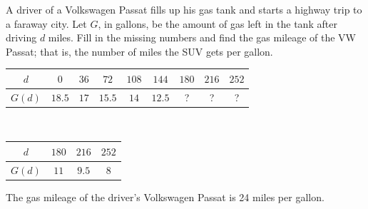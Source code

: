 


\begin{exercise}
A driver of a Volkswagen Passat fills up his gas tank and starts a highway trip to a faraway city. Let $G$, in gallons, be the amount of gas left in the tank after driving $d$ miles. Fill in the missing numbers and find the gas mileage of the VW Passat; that is, the number of miles the SUV gets per gallon.

\begin{center}
\begin{tabular}{|c|c|c|c|c|c|c|c|c|}
\hline
$d$ & $0$ & $36$ & $72$ & $108$ & $144$ & $180$ & $216$ & $252$ \\\hline
$G(d)$ & $18.5$  & $17$  & $15.5$ &  $14$ &  $12.5$ &  ? & ? & ?\\\hline
\end{tabular}
\end{center}

\end{exercise}



\begin{solution}
\vspace{10pt}
\\\begin{minipage}[]{0.5\textwidth}
\begin{center}
\begin{tabular}{|c|c|c|c|} \hline
$d$ & $180$ & $216$ & $252$ \\ \hline
$G(d)$ & $11$ & $9.5$ & $8$ \\ \hline
\end{tabular}
\end{center}
\end{minipage}
\begin{minipage}[]{0.5\textwidth}
The gas mileage of the driver's Volkswagen Passat is 24 miles per gallon.
\end{minipage}

\end{solution}





